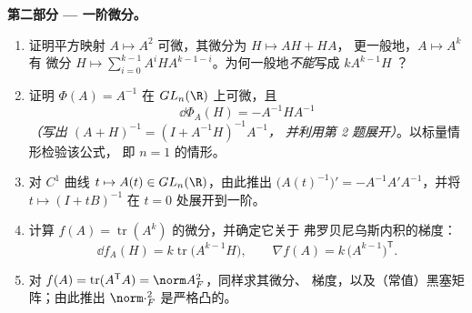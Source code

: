 \begin{problem}
\medskip
\noindent\textbf{第二部分 --- 一阶微分。}
\begin{enumerate}[resume]
  \item 证明平方映射 $A \mapsto A^2$
        可微，其微分为 $H \mapsto AH + HA$，
        更一般地，$A \mapsto A^k$ 有
        微分 $H \mapsto \sum_{i=0}^{k-1}
        A^iHA^{k-1-i}$。为何一般地\emph{不能}写成 $kA^{k-1}H$
        ？
  \item 证明 $\Phi(A) = A^{-1}$ 在
        $GL_n(\R)$ 上可微，且
        \[
        \dd\Phi_A(H) = -A^{-1}HA^{-1}
        \]
        \emph{（写出 $(A + H)^{-1} = (I + A^{-1}H)^{-1}A^{-1}$，
        并利用第 2 题展开）}。以标量情形检验该公式，
        即 $n = 1$ 的情形。
  \item 对 $C^1$ 曲线 $t \mapsto A(t) \in GL_n(\R)$，由此推出
        $\bigl(A(t)^{-1}\bigr)' = -A^{-1}A'A^{-1}$，并将
        $t \mapsto (I + tB)^{-1}$ 在 $t = 0$ 处展开到一阶。
  \item 计算 $f(A) =
        \operatorname{tr}(A^k)$ 的微分，并确定它关于
        弗罗贝尼乌斯内积的梯度：
        \[
        \dd f_A(H) = k\operatorname{tr}\bigl(A^{k-1}H\bigr),
        \qquad
        \nabla f(A) = k\,\bigl(A^{k-1}\bigr)^{\mathsf T} .
        \]
  \item 对 $f(A) = \operatorname{tr}
        (A^{\mathsf T}A) = \norm A_F^2$，同样求其微分、
        梯度，以及（常值）黑塞矩阵；由此推出
        $\norm\cdot_F^2$ 是严格凸的。
\end{enumerate}


\end{problem}
